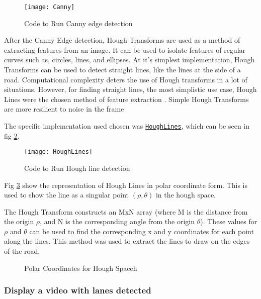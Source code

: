 \documentclass[conference]{IEEEtran}
\begin{document}
\begin{figure}[H]
\centerline{\texttt{[image: Canny]}}
\caption{Code to Run Canny edge detection}
\label{fig:Canny}
\end{figure}

After the Canny Edge detection, Hough Transforms are used as a method of extracting features from an image. It can be used to isolate features of regular curves such as, circles, lines, and ellipses. At it's simplest implementation, Hough Transforms can be used to detect straight lines, like the lines at the side of a road. Computational complexity deters the use of Hough transforms in a lot of situations. However, for finding straight lines, the most simplistic use case, Hough Lines were the chosen method of feature extraction \cite{Hough_Transform}. Simple Hough Transforms are more resilient to noise in the frame \cite{Hough_Lines_Better_Against_Noise}

The specific implementation used chosen was \href{https://docs.opencv.org/3.4/d9/db0/tutorial_hough_lines.html}{\texttt{HoughLines}}, which can be seen in fig \ref{fig:HoughLines}.

\begin{figure}[H]
\centerline{\texttt{[image: HoughLines]}}
\caption{Code to Run Hough line detection}
\label{fig:HoughLines}
\end{figure}

Fig \ref{fig:Polar_Coordinates_for_Hough_transforms} show the representation of Hough Lines in polar coordinate form. This is used to show the line as a singular point $(\rho, \theta)$ in the hough space. 

The Hough Transform constructs an MxN array (where M is the distance from the origin $\rho$, and N is the corresponding angle from the origin $\theta$). These values for $\rho$ and $\theta$ can be used to find the corresponding x and y coordinates for each point along the lines. This method was used to extract the lines to draw on the edges of the road. 

\begin{figure}[H]
\centering
{}
\caption{Polar Coordinates for Hough Spaceh}
\label{fig:Polar_Coordinates_for_Hough_transforms}
\end{figure} 

\subsubsection{Display a video with lanes detected}
\end{document}
